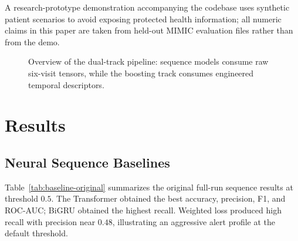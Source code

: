 \documentclass[conference]{IEEEtran}
\begin{document}
A research-prototype demonstration accompanying the codebase uses synthetic patient scenarios to avoid exposing protected health information; all numeric claims in this paper are taken from held-out MIMIC evaluation files rather than from the demo.

\begin{figure}[t]
\centering
{}
\caption{Overview of the dual-track pipeline: sequence models consume raw six-visit tensors, while the boosting track consumes engineered temporal descriptors.}
\label{fig:pipeline}
\end{figure}

\section{Results}

\subsection{Neural Sequence Baselines}
Table~\ref{tab:baseline-original} summarizes the original full-run sequence results at threshold $0.5$. The Transformer obtained the best accuracy, precision, F1, and ROC-AUC; BiGRU obtained the highest recall. Weighted loss produced high recall with precision near $0.48$, illustrating an aggressive alert profile at the default threshold.
\end{document}
